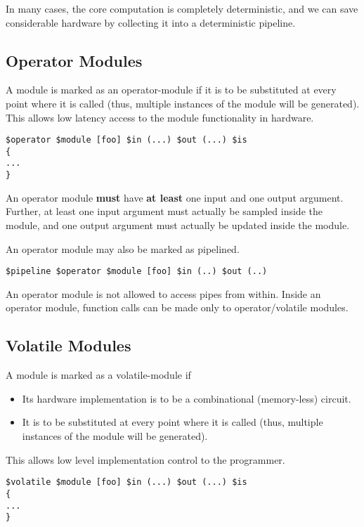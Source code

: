 \documentclass{article}
\begin{document}
In many cases, the core computation is completely
deterministic, and we can save considerable hardware
by collecting it into a deterministic pipeline.

\subsection{Operator Modules} \label{sec:OperatorModules}

A module is marked as an operator-module if it
is to be substituted at every point where it
is called (thus, multiple instances of the module
will be generated).
This allows low latency access to the module
functionality in hardware.

\begin{verbatim}
$operator $module [foo] $in (...) $out (...) $is
{
...
}
\end{verbatim}

An operator module {\bf must} have {\bf at least} one input
and one output argument.  Further, at least one input argument
must actually be sampled inside the module, and one output argument
must actually be updated inside the module.

An operator module may also be marked as pipelined.
\begin{verbatim}
$pipeline $operator $module [foo] $in (..) $out (..)
\end{verbatim}

An operator module is not allowed to access pipes from within.
Inside an operator module, function calls can be made only
to operator/volatile modules.

\subsection{Volatile Modules} \label{sec:VolatileModules}

A module is marked as a volatile-module if 
\begin{itemize}
\item Its hardware implementation is to be 
a combinational (memory-less) circuit.
\item It is to be substituted at every point where it
is called (thus, multiple instances of the module
will be generated).
\end{itemize}
This allows low level implementation control
to the programmer.

\begin{verbatim}
$volatile $module [foo] $in (...) $out (...) $is
{
...
}
\end{verbatim}
\end{document}
